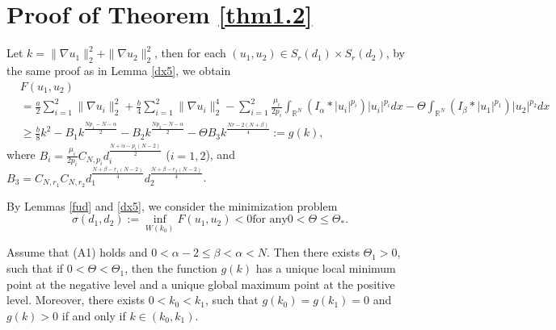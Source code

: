 \documentclass[reqno]{amsart}
\begin{document}
\section{Proof of Theorem \ref{thm1.2}}

Let $k=\| \nabla u_1\|_2^2+\| \nabla u_2\|_2^2$, then for each 
$(u_1,u_2)\in S_r(d_1)\times S_r(d_2)$, by the same
proof as in Lemma \ref{dx5}, we obtain
\begin{align*}
&F(u_1,u_2) \\
&= \frac{a}{2}\sum_{i=1}^2\| \nabla u_i\|_2^2
 +\frac{b}{4}\sum_{i=1}^2\| \nabla u_i\|_2^4
 - \sum_{i=1}^2\frac{\mu_i}{2p_i}\int_{\mathbb{R}^N}(I_\alpha\ast|u_i|^{p_i})
 |u_i|^{p_i}dx-\Theta\int_{\mathbb{R}^N}(I_\beta\ast|u_1|^{p_1})|u_2|^{p_2}dx\\
&\geq \frac{b}{8}k^2-B_1k^{\frac{Np_1-N-\alpha}{2}}-B_2k^{\frac{Np_2-N-\alpha}{2}}
 -\Theta B_3k^{\frac{Nr-2(N+\beta)}{4}}:=g(k),
\end{align*}
where $B_i=\frac{\mu_i}{2p_i}C_{N,p_i}d_i^{\frac{N+\alpha-p_i(N-2)}{2}}$ ($i=1,2$), 
and $B_3=C_{N,r_1}C_{N,r_2}d_1^{\frac{N+\beta-r_1(N-2)}{4}}
d_2^{\frac{N+\beta-r_2(N-2)}{4}}$.

By Lemmas \ref{fud} and \ref{dx5}, we consider the  minimization problem
\[
\sigma(d_1,d_2):=\inf_{W(k_0)} F(u_1,u_2)<0 \text{for any} 0<\Theta\leq\Theta_*.
\]

\begin{lemma}\label{ddh3}
Assume that {\rm (A1)} holds and $0<\alpha-2\leq\beta<\alpha<N$. Then
there exists $\Theta_1>0$, such that if $0<\Theta<\Theta_1$, then the function $g(k)$
 has a unique local minimum point at the negative
level and a unique global maximum point at the positive level.
 Moreover, there exists $0<k_0<k_1$, such that $g(k_0)=g(k_1)=0$ and $g(k)>0$ 
 if and only if $k\in(k_0,k_1)$.
\end{lemma}
\end{document}
